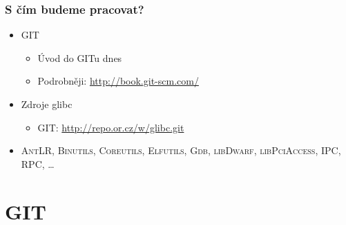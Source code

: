 
\begin{frame}
  \frametitle{S čím budeme pracovat?}

  \begin{itemize}
    \item GIT
    \begin{itemize}
      \item Úvod do GITu dnes
      \item Podrobněji: \url{http://book.git-scm.com/}
    \end{itemize}

%

    \pause

    \item Zdroje glibc
    \begin{itemize}
      \item GIT: \url{http://repo.or.cz/w/glibc.git}
    \end{itemize}

    \pause

    \item \textsc{AntLR}, \textsc{Binutils}, \textsc{Coreutils},
      \textsc{Elfutils}, \textsc{Gdb}, \textsc{libDwarf},
      \textsc{libPciAccess}, \iffimuni IPC, RPC, \fi\dots

  \end{itemize}

\end{frame}

\section{GIT}
\frame{\sectionpage}

